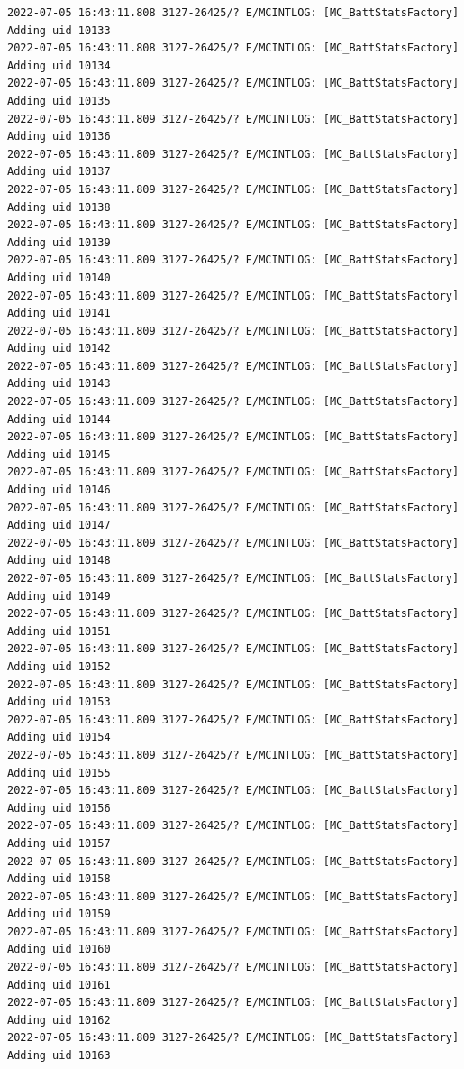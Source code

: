 \documentclass[a4paper,12pt]{book}
\begin{document}
\begin{lstlisting}
2022-07-05 16:43:11.808 3127-26425/? E/MCINTLOG: [MC_BattStatsFactory] Adding uid 10133
2022-07-05 16:43:11.808 3127-26425/? E/MCINTLOG: [MC_BattStatsFactory] Adding uid 10134
2022-07-05 16:43:11.809 3127-26425/? E/MCINTLOG: [MC_BattStatsFactory] Adding uid 10135
2022-07-05 16:43:11.809 3127-26425/? E/MCINTLOG: [MC_BattStatsFactory] Adding uid 10136
2022-07-05 16:43:11.809 3127-26425/? E/MCINTLOG: [MC_BattStatsFactory] Adding uid 10137
2022-07-05 16:43:11.809 3127-26425/? E/MCINTLOG: [MC_BattStatsFactory] Adding uid 10138
2022-07-05 16:43:11.809 3127-26425/? E/MCINTLOG: [MC_BattStatsFactory] Adding uid 10139
2022-07-05 16:43:11.809 3127-26425/? E/MCINTLOG: [MC_BattStatsFactory] Adding uid 10140
2022-07-05 16:43:11.809 3127-26425/? E/MCINTLOG: [MC_BattStatsFactory] Adding uid 10141
2022-07-05 16:43:11.809 3127-26425/? E/MCINTLOG: [MC_BattStatsFactory] Adding uid 10142
2022-07-05 16:43:11.809 3127-26425/? E/MCINTLOG: [MC_BattStatsFactory] Adding uid 10143
2022-07-05 16:43:11.809 3127-26425/? E/MCINTLOG: [MC_BattStatsFactory] Adding uid 10144
2022-07-05 16:43:11.809 3127-26425/? E/MCINTLOG: [MC_BattStatsFactory] Adding uid 10145
2022-07-05 16:43:11.809 3127-26425/? E/MCINTLOG: [MC_BattStatsFactory] Adding uid 10146
2022-07-05 16:43:11.809 3127-26425/? E/MCINTLOG: [MC_BattStatsFactory] Adding uid 10147
2022-07-05 16:43:11.809 3127-26425/? E/MCINTLOG: [MC_BattStatsFactory] Adding uid 10148
2022-07-05 16:43:11.809 3127-26425/? E/MCINTLOG: [MC_BattStatsFactory] Adding uid 10149
2022-07-05 16:43:11.809 3127-26425/? E/MCINTLOG: [MC_BattStatsFactory] Adding uid 10151
2022-07-05 16:43:11.809 3127-26425/? E/MCINTLOG: [MC_BattStatsFactory] Adding uid 10152
2022-07-05 16:43:11.809 3127-26425/? E/MCINTLOG: [MC_BattStatsFactory] Adding uid 10153
2022-07-05 16:43:11.809 3127-26425/? E/MCINTLOG: [MC_BattStatsFactory] Adding uid 10154
2022-07-05 16:43:11.809 3127-26425/? E/MCINTLOG: [MC_BattStatsFactory] Adding uid 10155
2022-07-05 16:43:11.809 3127-26425/? E/MCINTLOG: [MC_BattStatsFactory] Adding uid 10156
2022-07-05 16:43:11.809 3127-26425/? E/MCINTLOG: [MC_BattStatsFactory] Adding uid 10157
2022-07-05 16:43:11.809 3127-26425/? E/MCINTLOG: [MC_BattStatsFactory] Adding uid 10158
2022-07-05 16:43:11.809 3127-26425/? E/MCINTLOG: [MC_BattStatsFactory] Adding uid 10159
2022-07-05 16:43:11.809 3127-26425/? E/MCINTLOG: [MC_BattStatsFactory] Adding uid 10160
2022-07-05 16:43:11.809 3127-26425/? E/MCINTLOG: [MC_BattStatsFactory] Adding uid 10161
2022-07-05 16:43:11.809 3127-26425/? E/MCINTLOG: [MC_BattStatsFactory] Adding uid 10162
2022-07-05 16:43:11.809 3127-26425/? E/MCINTLOG: [MC_BattStatsFactory] Adding uid 10163

\end{lstlisting}
\end{document}
